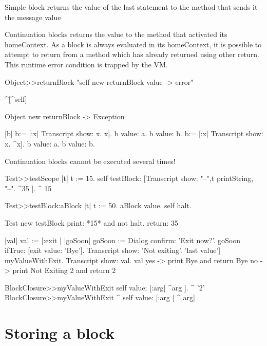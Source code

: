 \documentclass[a4paper,10pt,twoside]{book}
\begin{document}
Simple block \ct{[:x :y| x*x. x+y]} returns the value of the last statement to the method that sends it the message value

Continuation blocks \ct{[:x :y| ^ x + y]} returns the value to the method that activated its homeContext. As a block is always evaluated in its homeContext, it is possible to attempt to return from a method which has already returned using other return. This runtime error condition is trapped by the VM.

\begin{code}{}
Object>>returnBlock
	"self new returnBlock value -> error"

	^[^self]

Object new returnBlock
-> Exception
\end{code}	
	
	
\begin{code}{}
|b| 
b:= [:x| Transcript show: x. x].
b value: a. b value: b.
b:= [:x| Transcript show: x. ^x].
b value: a. b value: b.
\end{code}
 
Continuation blocks cannot be executed several times!

\begin{code}{}
Test>>testScope
	   |t|
    	t := 15.
	   self testBlock: [Transcript show: "--",t printString, "--".
	   ^35 ].
    ^ 15

Test>>testBlock:aBlock
	   |t|
	   t := 50.
	   aBlock value.
	   self halt.
\end{code}

\begin{code}{}
Test new testBlock 	
print: *15* and not halt. 
return: 35
\end{code}


\begin{code}{}
|val|
val := [:exit |
		|goSoon|
		goSoon := Dialog confirm: 'Exit now?'.
		goSoon ifTrue: [exit value: 'Bye'].
		Transcript show: 'Not exiting'.
		'last value'] myValueWithExit.
Transcript show: val.
val
yes -> print Bye and return  Bye
no -> print Not Exiting 2 and return 2
\end{code}

\begin{code}{}
BlockClosure>>myValueWithExit
	      self value: [:arg| ^arg ].
      ^ '2'
BlockClosure>>myValueWithExit
 ^ self value: [:arg | ^ arg]        
\end{code}



\section{Storing a block}
\end{document}
